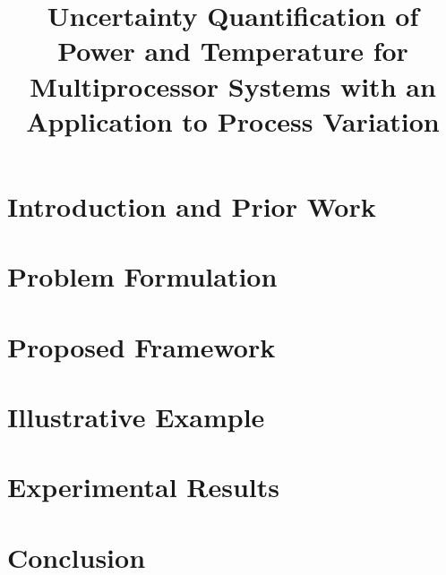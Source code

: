 \documentclass{sig-alternate}
\begin{document}
  \title{Uncertainty Quantification of Power and Temperature for Multiprocessor Systems with an Application to Process Variation}

  \maketitle

  \begin{abstract}
    
  \end{abstract}

  \section{Introduction and Prior Work} 
  

  \vspace{-0.5em}
  \section{Problem Formulation}    
  

  \vspace{-0.5em}
  \section{Proposed Framework} 
  

  \vspace{-0.5em}
  \section{Illustrative Example} 
  

  \vspace{-0.5em}
  \section{Experimental Results} 
  

  \vspace{-0.5em}
  \section{Conclusion} 
  

  \vspace{-1.2em}
  \begingroup
  \setlength\bibitemsep{1pt}
  \printbibliography
  \endgroup

  \appendix
  
\end{document}
